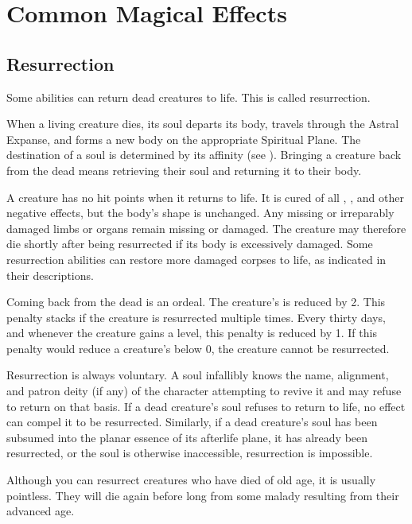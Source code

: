 \section{Common Magical Effects}

  \subsection{Resurrection}\label{Resurrection}
    Some abilities can return dead creatures to life.
    This is called resurrection.

    When a living creature dies, its soul departs its body, travels through the Astral Expanse, and forms a new body on the appropriate Spiritual Plane.
    The destination of a soul is determined by its affinity (see ).
    Bringing a creature back from the dead means retrieving their soul and returning it to their body.

    A creature has no hit points when it returns to life.
    It is cured of all , , and other negative effects, but the body's shape is unchanged.
    Any missing or irreparably damaged limbs or organs remain missing or damaged.
    The creature may therefore die shortly after being resurrected if its body is excessively damaged.
    Some resurrection abilities can restore more damaged corpses to life, as indicated in their descriptions.

    Coming back from the dead is an ordeal.
    The creature's  is reduced by 2.
    This penalty stacks if the creature is resurrected multiple times.
    Every thirty days, and whenever the creature gains a level, this penalty is reduced by 1.
    If this penalty would reduce a creature's  below 0, the creature cannot be resurrected.

    Resurrection is always voluntary.
    A soul infallibly knows the name, alignment, and patron deity (if any) of the character attempting to revive it and may refuse to return on that basis.
    If a dead creature's soul refuses to return to life, no effect can compel it to be resurrected.
    Similarly, if a dead creature's soul has been subsumed into the planar essence of its afterlife plane, it has already been resurrected, or the soul is otherwise inaccessible, resurrection is impossible.

    Although you can resurrect creatures who have died of old age, it is usually pointless.
    They will die again before long from some malady resulting from their advanced age.

